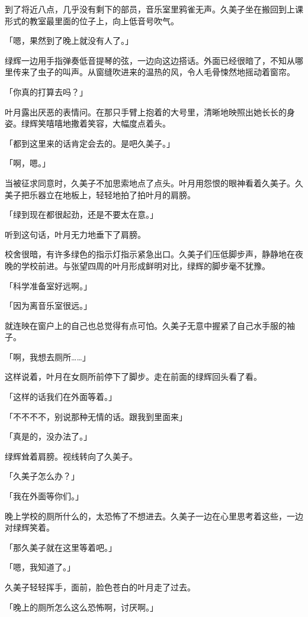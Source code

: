 \documentclass[UTF8]{ctexart}
\begin{document}
    到了将近八点，几乎没有剩下的部员，音乐室里鸦雀无声。久美子坐在搬回到上课形式的教室最里面的位子上，向上低音号吹气。

    「嗯，果然到了晚上就没有人了。」

    绿辉一边用手指弹奏低音提琴的弦，一边向这边搭话。外面已经很暗了，不知从哪里传来了虫子的叫声。从窗缝吹进来的温热的风，令人毛骨悚然地摇动着窗帘。

    「你真的打算去吗？」

    叶月露出厌恶的表情问。在那只手臂上抱着的大号里，清晰地映照出她长长的身姿。绿辉笑嘻嘻地撒着笑容，大幅度点着头。

    「都到这里来的话肯定会去的。是吧久美子。」

    「啊，嗯。」

    当被征求同意时，久美子不加思索地点了点头。叶月用怨恨的眼神看着久美子。久美子把乐器立在地板上，轻轻地拍了拍叶月的肩膀。

    「绿到现在都很起劲，还是不要太在意。」

    听到这句话，叶月无力地垂下了肩膀。

    校舍很暗，有许多绿色的指示灯指示紧急出口。久美子们压低脚步声，静静地在夜晚的学校前进。与张望四周的叶月形成鲜明对比，绿辉的脚步毫不犹豫。

    「科学准备室好远啊。」

    「因为离音乐室很远。」

    就连映在窗户上的自己也总觉得有点可怕。久美子无意中握紧了自己水手服的袖子。

    「啊，我想去厕所……」

    这样说着，叶月在女厕所前停下了脚步。走在前面的绿辉回头看了看。

    「这样的话我们在外面等着。」

    「不不不不，别说那种无情的话。跟我到里面来」

    「真是的，没办法了。」

    绿辉耸着肩膀。视线转向了久美子。

    「久美子怎么办？」

    「我在外面等你们。」

    晚上学校的厕所什么的，太恐怖了不想进去。久美子一边在心里思考着这些，一边对绿辉笑着。

    「那久美子就在这里等着吧。」

    「嗯，我知道了。」

    久美子轻轻挥手，面前，脸色苍白的叶月走了过去。

    「晚上的厕所怎么这么恐怖啊，讨厌啊。」
\end{document}
